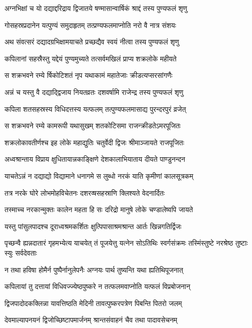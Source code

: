 \twolineshloka
{अग्नभिक्षां च यो दद्याद्दरिद्राय द्विजातये}
{षण्मासान्वार्षिकं श्राद्दं तस्य पुण्यफलं शृणु}


\twolineshloka
{गोसहस्रप्रदानेन यत्पुण्यं समुदाहृतम्}
{तत्प्रण्यफलमाप्नोति नरो वै नात्र संशयः}


\twolineshloka
{अथ संवत्सरं दद्यादग्रभिक्षामयाचते}
{प्रच्छद्यैव स्वयं नीत्वा तस्य पुण्यफलं शृणु}


\twolineshloka
{कपिलानां सहस्रैस्तु यद्देयं पुण्यमुच्यते}
{तत्सर्वमखिलं प्राप्य शक्रलोके महीयते}


\twolineshloka
{स शक्रभवने रम्ये र्षिकोटिशतं नृप}
{यथाकामं महातेजाः क्रीडत्यप्सरसांगणैः}


\twolineshloka
{अन्नं च यस्तु वै दद्याद्द्विजाय नियतव्रतः}
{दशवर्षामि राजेन्द्र तस्य पुण्यफलं शृणु}


\twolineshloka
{कपिला शतसहस्रस्य विधिदत्तस्य यत्फलम्}
{तत्पुण्यफलमासाद्य पुरन्दरपुरं व्रजेत्}


\twolineshloka
{स शक्रभवने रम्ये कामरूपी यथासुखम्}
{शतकोटिसमा राजन्क्रीडतेऽमरपूजितः}


\twolineshloka
{शक्रलोकावतीर्णश्च इह लोके महाद्युतिः}
{चतुर्वेदी द्विजः श्रीमाञ्जायते राजपूजितः}


\twolineshloka
{अध्वश्रान्ताय विप्राय क्षुधितायान्नकाङ्क्षिणे}
{देशकालाभियाताय दीयते पाण्डुनन्दन}


\twolineshloka
{याचतेऽन्नं न दद्याद्यो विद्यामाने धनागमे}
{स लुब्धो नरकं याति कृमीणां कालसूत्रकम्}


\twolineshloka
{तत्र नरके घोरे लोभमोहविचेतनः}
{दशरव्षसहस्राणि क्लिश्यते वेदनार्दितः}


\threelineshloka
{तस्माच्च नरकान्मुक्तः कालेन महता हि सः}
{दरिद्रो मानुषे लोके चण्डालेष्वपि जायते}
{}


\twolineshloka
{यस्तु पांसुलपादश्च दूराध्वश्रमकर्शितः}
{क्षुत्पिपासाश्रमश्रान्त आर्तः खिन्नगतिर्द्विजः}


\threelineshloka
{पृच्छन्वै ह्यन्नदातारं गृहमभ्येत्य याचयेत्}
{तं पूजयेत्तु यत्नेन सोऽतिथिः स्वर्गसंक्रमः}
{तस्मिंस्तुष्टे नरश्रेष्ठ तुष्टाः स्युः सर्वदेवताः}


\twolineshloka
{न तथा हविषा होमैर्न पुष्पैर्नानुलेपनैः}
{अग्नयः पार्थ तुष्यन्ति यथा ह्यतिथिपूजनात्}


\threelineshloka
{कपिलायां तु दत्तायां विधिवज्ज्येष्ठपुष्करे}
{न तत्फलमवाप्नोति यत्फलं विप्रबोजनान्}
{}


\twolineshloka
{द्विजपादोदकक्लिन्ना यावत्तिष्ठति मेदिनी}
{तावत्पुष्करपत्रेण पिबन्ति पितरो जलम्}


\twolineshloka
{देवमाल्यापनयनं द्विजोच्छिष्टापमार्जनम्}
{श्रान्तसंवाहनं चैव तथा पादावसेचनम्}


